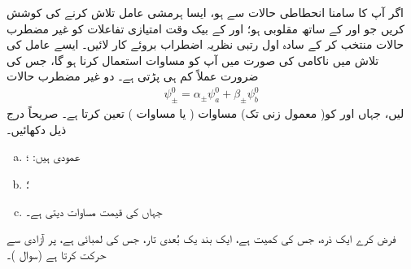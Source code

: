  اگر آپ کا سامنا انحطاطی حالات سے ہو، ایسا ہرمشی عامل  تلاش کرنے کی کوشش کریں جو  اور  کے ساتھ مقلوبی ہو؛  اور  کے بیک وقت امتیازی تفاعلات کو غیر مضطرب حالات منتخب کر کے سادہ اول رتبی نظریہ اضطراب بروئے کار لائیں۔ ایسے عامل کی تلاش میں ناکامی کی صورت میں آپ کو مساوات  استعمال کرنا ہو گا، جس کی ضرورت عملاً کم ہی پڑتی ہے۔
 دو غیر مضطرب حالات
\begin{align*}
\psi_\pm^0 = \alpha_\pm \psi_a^0 + \beta_\pm \psi_b^0
\end{align*}
لیں، جہاں  اور  کو( معمول زنی تک) مساوات  ( یا مساوات ) تعین کرتا ہے۔ صریحاً درج ذیل دکھائیں۔
\begin{enumerate}[a.]
\item
{} عمودی ہیں: ؛
\item
{}؛
\item
{} جہاں  کی قیمت مساوات  دیتی ہے۔ 
\end{enumerate}
فرض کرے ایک ذرہ، جس کی کمیت  ہے، ایک بند یک بُعدی تار، جس کی لمبائی  ہے، پر آزادی سے حرکت کرتا ہے (سوال )۔ 
